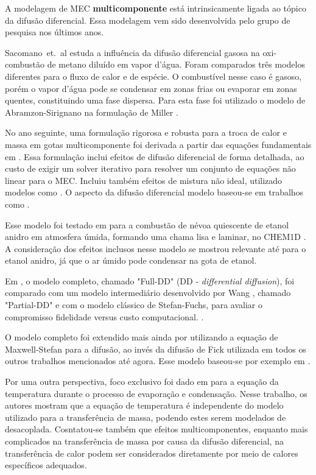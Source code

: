 
A modelagem de MEC \textbf{multicomponente} está intrinsicamente ligada ao tópico da difusão diferencial.
Essa modelagem vem sido desenvolvida pelo grupo de pesquisa nos últimos anos.

Sacomano~et.~al \cite{SacomanoF2021Fluids} estuda a influência da difusão diferencial gasosa na oxi-combustão de metano diluído em vapor d'água. 
Foram comparados três modelos diferentes para o fluxo de calor e de espécie.
O combustível nesse caso é gasoso, porém o vapor d'água pode se condensar em zonas frias ou evaporar em zonas quentes, constituindo uma fase dispersa.
Para esta fase foi utilizado o modelo de Abramzon-Sirignano \cite{Sirignano1989} na formulação de Miller \cite{MillerR1998}.

No ano seguinte, uma formulação rigorosa e robusta para a troca de calor e massa em gotas multicomponente foi derivada a partir das equações fundamentais em \cite{SacomanoF2022IJHMT}.
Essa formulação inclui efeitos de difusão diferencial de forma detalhada, ao custo de exigir um solver iterativo para resolver um conjunto de equações não linear para o MEC.
Incluiu também efeitos de mistura não ideal, utilizado modelos como .
O aspecto da difusão diferencial modelo baseou-se em trabalhos como \cite{ToniniS2015IJTS, ZhangL2012Fuel}. 

Esse modelo foi testado em \cite{SacomanoF2024CF} para a combustão de névoa quiescente de etanol anidro em atmosfera úmida, formando uma chama lisa e laminar, no CHEM1D \cite{Sommers1994PhD}.
A consideração dos efeitos inclusos nesse modelo se mostrou relevante até para o etanol anidro, já que o ar úmido pode condensar na gota de etanol.

Em \cite{SacomanoF2025CF}, o modelo completo, chamado "Full-DD" (DD - \emph{differential diffusion}), foi comparado com um modelo intermediário desenvolvido por Wang \cite{WangC2013CF}, chamado "Partial-DD" e com o modelo clássico de Stefan-Fuchs, para avaliar o compromisso fidelidade versus custo computacional.
.

O modelo completo foi extendido mais ainda por \cite{SantosA2024IJHMT} utilizando a equação de Maxwell-Stefan para a difusão, ao invés da difusão de Fick utilizada em todos os outros trabalhos mencionados até agora.
Esse modelo baseou-se por exemplo em \cite{ToniniS2015IJTS}.

Por uma outra perspectiva, foco exclusivo foi dado em \cite{SantosA2023IJHMT} para a equação da temperatura durante o processo de evaporação e condensação.
Nesse trabalho, os autores mostram que a equação de temperatura é independente do modelo utilizado para a transferência de massa, podendo estes serem modelados de desacoplada.
Cosntatou-se também que efeitos multicomponentes, enquanto mais complicados na transferência de massa por causa da difusão diferencial, na transferência de calor podem ser considerados diretamente por meio de calores específicos adequados.

